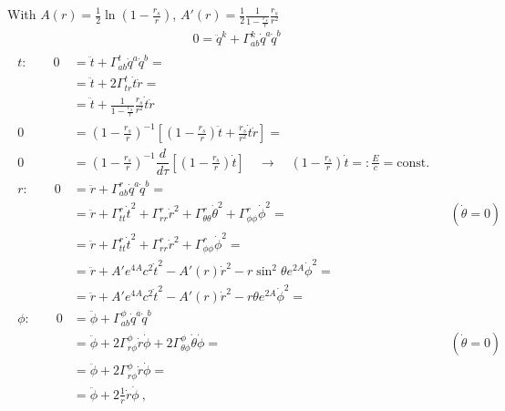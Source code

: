 \documentclass[letterpaper,10pt,english]{jupyterBook}
\begin{document}
\sphinxAtStartPar
{} With \(A(r) = \frac{1}{2} \ln \left( 1 - \frac{r_s}{r} \right)\), \(A'(r) = \frac{1}{2} \frac{1}{1 - \frac{r_s}{r}} \frac{r_s}{r^2}\)
\begin{equation*}
\begin{split}0 = \ddot{q}^k + \Gamma_{a b}^k \dot{q}^{a} \dot{q}^b\end{split}
\end{equation*}\begin{equation*}
\begin{split}\begin{aligned}
  t : \qquad 
  0 & = \ddot{t} + \Gamma_{ab}^t \dot{q}^a \dot{q}^b = \\
    & = \ddot{t} + 2 \Gamma_{tr}^t \dot{t} \dot{r} = \\
    & = \ddot{t} + \frac{1}{1 - \frac{r_s}{r}} \frac{r_s}{r^2} \dot{t} \dot{r} \\
  0 & = \left(1 - \frac{r_s}{r} \right)^{-1} \left[ \left( 1-\frac{r_s}{r}\right) \ddot{t} + \frac{r_s}{r^2} \dot{t} \dot{r} \right] = \\
  0 & = \left(1 - \frac{r_s}{r} \right)^{-1} \dfrac{d}{d \tau} \left[ \left( 1-\frac{r_s}{r} \right) \dot{t} \right] \quad \rightarrow \quad \left( 1-\frac{r_s}{r} \right) \dot{t} =: \frac{E}{c} = \text{const.} \\
  r : \qquad 
  0 & = \ddot{r} + \Gamma_{ab}^r \dot{q}^a \dot{q}^b = \\
    & = \ddot{r} + \Gamma_{tt}^r \dot{t}^2 + \Gamma_{rr}^r \dot{r}^2 + \Gamma_{\theta \theta}^{r} \dot{\theta}^2 + \Gamma_{\phi \phi}^{r} \dot{\phi}^2 = && (\dot{\theta} = 0 )\\
    & = \ddot{r} + \Gamma_{tt}^r \dot{t}^2 + \Gamma_{rr}^r \dot{r}^2 + \Gamma_{\phi \phi}^{r} \dot{\phi}^2 = \\
    & = \ddot{r} + A' e^{4 A} c^2 \dot{t}^2 - A'(r) \dot{r}^2 - r \sin^2 \theta e^{2 A} \dot{\phi}^2 = \\
    & = \ddot{r} + A' e^{4 A} c^2 \dot{t}^2 - A'(r) \dot{r}^2 - r \theta e^{2 A} \dot{\phi}^2 = \\
  \phi : \qquad 
  0 & = \ddot{\phi} + \Gamma_{ab}^{\phi} \dot{q}^a \dot{q}^b  \\
    & = \ddot{\phi} + 2 \Gamma_{r \phi}^\phi \dot{r} \dot{\phi} + 2 \Gamma_{\theta \phi}^\phi \dot{\theta} \dot{\phi} =  && ( \dot{\theta} = 0 ) \\
    & = \ddot{\phi} + 2 \Gamma_{r \phi}^\phi \dot{r} \dot{\phi} = \\
    & = \ddot{\phi} + 2 \frac{1}{r} \dot{r} \dot{\phi} \ , \\

\end{aligned}
\end{split}
\end{equation*}
\end{document}
